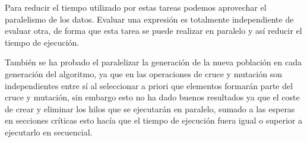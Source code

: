 Para reducir el tiempo utilizado por estas tareas podemos aprovechar el paralelismo de los datos. Evaluar una expresión es totalmente independiente de evaluar otra, de forma que esta tarea se puede realizar en paralelo y así reducir el tiempo de ejecución.

También se ha probado el paralelizar la generación de la nueva población en cada generación del algoritmo, ya que en las operaciones de cruce y mutación son independientes entre sí al seleccionar a priori que elementos formarán parte del cruce y mutación, sin embargo esto no ha dado buenos resultados ya que el coste de crear y eliminar los hilos que se ejecutarán en paralelo, sumado a las esperas en secciones críticas esto hacía que el tiempo de ejecución fuera igual o superior a ejecutarlo en secuencial.

\newpage
